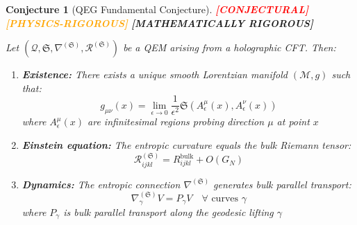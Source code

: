\documentclass[12pt,a4paper]{article}
\newtheorem{conjecture}[theorem]{Conjecture}
\newcommand{\rigormark}[1]{%
  \ifcase#1
    \textcolor{red}{\textbf{[CONJECTURAL]}}%
  \or
    \textcolor{orange}{\textbf{[PHYSICS-RIGOROUS]}}%
  \or
    \textcolor{green!50!black}{\textbf{[MATHEMATICALLY RIGOROUS]}}%
  \fi
}
\begin{document}
\begin{conjecture}[QEG Fundamental Conjecture]\label{thm:qeg-fundamental}
\rigormark{2}

Let $(\mathcal{Q}, \mathfrak{S}, \nabla^{(\mathfrak{S})}, \mathcal{R}^{(\mathfrak{S})})$ be a QEM arising from a holographic CFT. Then:
\begin{enumerate}
    \item \textbf{Existence:} There exists a unique smooth Lorentzian manifold $(\mathcal{M}, g)$ such that:
    \begin{equation}
    g_{\mu\nu}(x) = \lim_{\epsilon \to 0} \frac{1}{\epsilon^2} \mathfrak{S}(A_\epsilon^\mu(x), A_\epsilon^\nu(x))
    \end{equation}
    where $A_\epsilon^\mu(x)$ are infinitesimal regions probing direction $\mu$ at point $x$
    
    \item \textbf{Einstein equation:} The entropic curvature equals the bulk Riemann tensor:
    \begin{equation}
    \mathcal{R}^{(\mathfrak{S})}_{ijkl} = R^{\text{bulk}}_{ijkl} + O(G_N)
    \end{equation}
    
    \item \textbf{Dynamics:} The entropic connection $\nabla^{(\mathfrak{S})}$ generates bulk parallel transport:
    \begin{equation}
    \nabla^{(\mathfrak{S})}_\gamma V = P_\gamma V \quad \forall \text{ curves } \gamma
    \end{equation}
    where $P_\gamma$ is bulk parallel transport along the geodesic lifting $\gamma$
\end{enumerate}
\end{conjecture}
\end{document}
